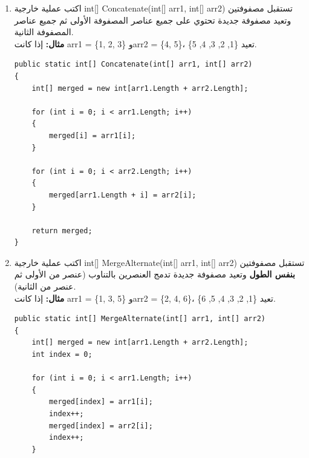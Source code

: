 \documentclass[14pt]{extarticle}
\begin{document}
\begin{enumerate}[resume, itemsep=2em]

    \item
    اكتب عملية خارجية \textenglish{int[] Concatenate(int[] arr1, int[] arr2)} تستقبل مصفوفتين وتعيد مصفوفة جديدة تحتوي على جميع عناصر المصفوفة الأولى ثم جميع عناصر المصفوفة الثانية.\\
    \textbf{مثال:} إذا كانت \textenglish{arr1 = \{1, 2, 3\}} و\textenglish{arr2 = \{4, 5\}}، تعيد \textenglish{\{1, 2, 3, 4, 5\}}.
    \ifwithsols
    \begin{boxSolution}
    \begin{english}
    \begin{verbatim}
public static int[] Concatenate(int[] arr1, int[] arr2)
{
    int[] merged = new int[arr1.Length + arr2.Length];

    for (int i = 0; i < arr1.Length; i++)
    {
        merged[i] = arr1[i];
    }

    for (int i = 0; i < arr2.Length; i++)
    {
        merged[arr1.Length + i] = arr2[i];
    }

    return merged;
}
    \end{verbatim}
    \end{english}
    \end{boxSolution}
    \fi

    \item
    اكتب عملية خارجية \textenglish{int[] MergeAlternate(int[] arr1, int[] arr2)} تستقبل مصفوفتين \textbf{بنفس الطول} وتعيد مصفوفة جديدة تدمج العنصرين بالتناوب (عنصر من الأولى ثم عنصر من الثانية).\\
    \textbf{مثال:} إذا كانت \textenglish{arr1 = \{1, 3, 5\}} و\textenglish{arr2 = \{2, 4, 6\}}، تعيد \textenglish{\{1, 2, 3, 4, 5, 6\}}.
    \ifwithsols
    \begin{boxSolution}
    \begin{english}
    \begin{verbatim}
public static int[] MergeAlternate(int[] arr1, int[] arr2)
{
    int[] merged = new int[arr1.Length + arr2.Length];
    int index = 0;

    for (int i = 0; i < arr1.Length; i++)
    {
        merged[index] = arr1[i];
        index++;
        merged[index] = arr2[i];
        index++;
    }


\end{verbatim}
\end{english}
\end{boxSolution}
\end{enumerate}
\end{document}
